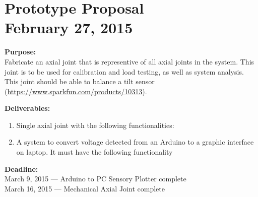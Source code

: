 \documentclass[11pt]{article}
\begin{document}
\section{Prototype Proposal \\ February 27, 2015}
\noindent \textbf{Purpose:}\\
\indent Fabricate an axial joint that is representive of all axial joints in the system. This joint is to be used for calibration and load testing, as well as system analysis.\\
\indent This joint should be able to balance a tilt sensor (\url{https://www.sparkfun.com/products/10313}).

\noindent \textbf{Deliverables:}
\begin{enumerate}
	\item Single axial joint with the following functionalities:
	\item A system to convert voltage detected from an Arduino to a graphic interface on laptop. It must have the following functionality
\end{enumerate}

\noindent \textbf{Deadline:}\\
March 9, 2015 --- Arduino to PC Sensory Plotter complete\\
March 16, 2015 --- Mechanical Axial Joint complete\\
\end{document}
